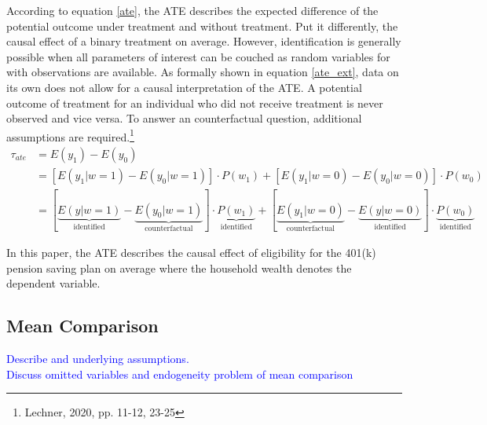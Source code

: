 \documentclass{article}
\begin{document}
According to equation \ref{ate}, the ATE describes the expected difference of the potential outcome under treatment and without treatment. Put it differently, the causal effect of a binary treatment on average. However, identification is generally possible when all parameters of interest can be couched as random variables for with observations are available. As formally shown in equation \ref{ate_ext}, data on its own does not allow for a causal interpretation of the ATE. A potential outcome of treatment for an individual who did not receive treatment is never observed and vice versa. To answer an counterfactual question, additional assumptions are required.\footnote{Lechner, 2020, pp. 11-12, 23-25} 
\begin{align}
    \tau_{ate} &= E(y_1) - E(y_0) \nonumber \\
    &= [E(y_1 | w=1) - E(y_0| w=1)] \cdot P(w_1) + [E(y_1 | w=0) - E(y_0| w=0)] \cdot P(w_0) \nonumber \\
    &= [\underbrace{E(y | w=1)}_{\text{identified}} - \underbrace{E(y_0| w=1)}_{\text{counterfactual}}] \cdot \underbrace{P(w_1)}_{\text{identified}} + [\underbrace{E(y_1 | w=0)}_{\text{counterfactual}} - \underbrace{E(y| w=0)}_{\text{identified}}] \cdot \underbrace{P(w_0)}_{\text{identified}}
    \label{ate_ext}
\end{align}

In this paper, the ATE describes the causal effect of eligibility for the 401(k) pension saving plan on average where the household wealth denotes the dependent variable. 


\subsection{Mean Comparison}

\textcolor{blue}{Describe and underlying assumptions.\\
Discuss omitted variables and endogeneity problem of mean comparison}\\
\end{document}
